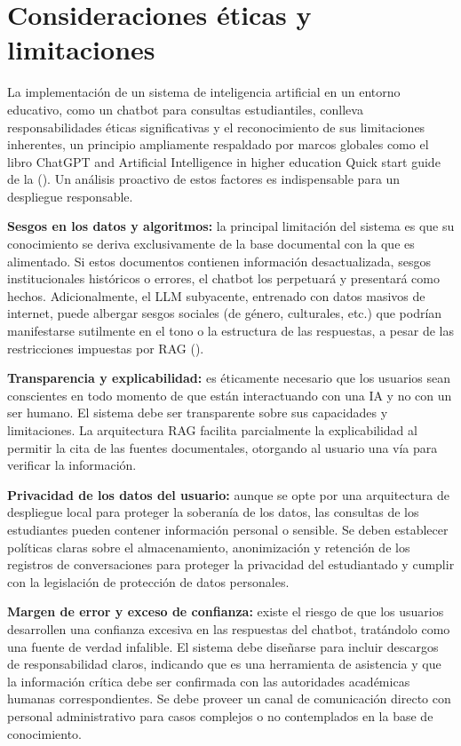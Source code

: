 {{\section{Consideraciones éticas y limitaciones}
La implementación de un sistema de inteligencia artificial en un entorno educativo, como un chatbot para consultas estudiantiles, conlleva responsabilidades éticas significativas y el reconocimiento de sus limitaciones inherentes, un principio ampliamente respaldado por marcos globales como el libro ChatGPT and Artificial Intelligence in higher education Quick start guide de la (\cite{unesco2023chatgpt}). Un análisis proactivo de estos factores es indispensable para un despliegue responsable.

\begin{listaenumerada}
    \item \textbf{Sesgos en los datos y algoritmos:} la principal limitación del sistema es que su conocimiento se deriva exclusivamente de la base documental con la que es alimentado. Si estos documentos contienen información desactualizada, sesgos institucionales históricos o errores, el chatbot los perpetuará y presentará como hechos. Adicionalmente, el LLM subyacente, entrenado con datos masivos de internet, puede albergar sesgos sociales (de género, culturales, etc.) que podrían manifestarse sutilmente en el tono o la estructura de las respuestas, a pesar de las restricciones impuestas por RAG (\cite{bender2021dangers}).
    \item \textbf{Transparencia y explicabilidad:} es éticamente necesario que los usuarios sean conscientes en todo momento de que están interactuando con una IA y no con un ser humano. El sistema debe ser transparente sobre sus capacidades y limitaciones. La arquitectura RAG facilita parcialmente la explicabilidad al permitir la cita de las fuentes documentales, otorgando al usuario una vía para verificar la información.
    \item \textbf{Privacidad de los datos del usuario:} aunque se opte por una arquitectura de despliegue local para proteger la soberanía de los datos, las consultas de los estudiantes pueden contener información personal o sensible. Se deben establecer políticas claras sobre el almacenamiento, anonimización y retención de los registros de conversaciones para proteger la privacidad del estudiantado y cumplir con la legislación de protección de datos personales.
    \item \textbf{Margen de error y exceso de confianza:} existe el riesgo de que los usuarios desarrollen una confianza excesiva en las respuestas del chatbot, tratándolo como una fuente de verdad infalible. El sistema debe diseñarse para incluir descargos de responsabilidad claros, indicando que es una herramienta de asistencia y que la información crítica debe ser confirmada con las autoridades académicas humanas correspondientes. Se debe proveer un canal de comunicación directo con personal administrativo para casos complejos o no contemplados en la base de conocimiento.
\end{listaenumerada}

}}
